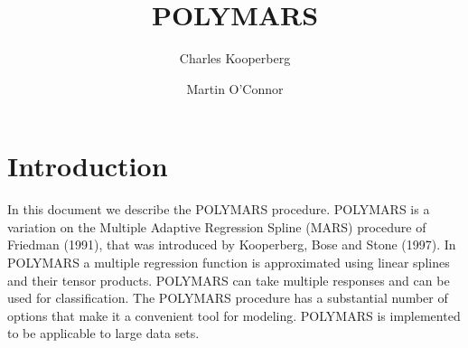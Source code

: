 
\textwidth17cm
\hoffset-3cm
\voffset-3cm
\parskip=6pt

\newcommand{\pic}[3]
                           {\begin{figure}[ht]
                           \begin{center}
                           \caption{\label{#1}#3}
                           \parbox{125mm}{
                           \epsfxsize=125mm
                           \epsfysize=90mm
                           \epsffile{#2.eps}}
                           \end{center}
                           \end{figure}}

\newcommand{\pics}[3]
                           {\begin{figure}[ht]
                           \begin{center}
                           \caption{\label{#1}#3}
                           \parbox{125mm}{
                           \epsfxsize=125mm
                           \epsfysize=60mm
                           \epsffile{#2.eps}}
                           \end{center}
                           \end{figure}}
\newcommand{\picl}[3]
                           {\begin{figure}[ht]
                           \begin{center}
                           \caption{\label{#1}#3}
                           \parbox{125mm}{
                           \epsfxsize=125mm
                           \epsfysize=140mm
                           \epsffile{#2.eps}}
                           \end{center}
                           \end{figure}}




\large
\title{POLYMARS}
\author{Charles Kooperberg \and Martin O'Connor}

\maketitle

\section{Introduction}
In this document we describe the POLYMARS procedure. POLYMARS is
a variation on the Multiple Adaptive Regression Spline
(MARS) procedure of Friedman (1991)\cite{F},
that was introduced by Kooperberg, Bose and
Stone (1997)\cite{I}. In POLYMARS 
a multiple regression function is approximated using
linear splines and their tensor products. POLYMARS can
take multiple responses and can be used for classification.
The POLYMARS procedure has a substantial number of options
that make it a convenient tool for modeling.
POLYMARS is implemented to be applicable to large data sets.
